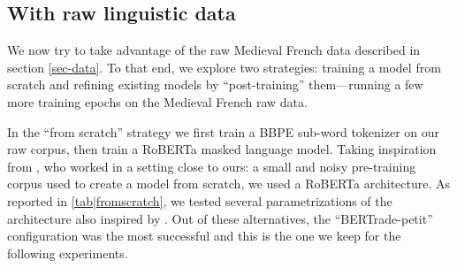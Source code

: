 \subsection{With raw linguistic data}\label{sec|withraw}

\begin{table}[ht]
    \centering
    \tablefontsize
    \caption{Results on SRCMF dev — Performances of different model sizes when training from scratch}\label{tab|fromscratch}
\end{table}

We now try to take advantage of the raw Medieval French data described in section \ref{sec-data}. To that end, we explore two strategies: training a model from scratch and refining existing models by \enquote{post-training} them---running a few more training epochs on the Medieval French raw data.

In the \enquote{from scratch} strategy we first train a BBPE sub-word tokenizer \citep{wang-cho-etal-2020-neural} on our raw corpus, then train a RoBERTa \citep{liu-etal-2019-roberta} masked language model. Taking inspiration from \citet{micheli-etal-2020-importance}, who worked in a setting close to ours: a small and noisy pre-training corpus used to create a model from scratch, we used a RoBERTa architecture. As reported in \cref{tab|fromscratch}, we tested several parametrizations of the architecture also inspired by \citet{turc-etal-2019-well}. Out of these alternatives, the \enquote{BERTrade-petit} configuration was the most successful and this is the one we keep for the following experiments.


